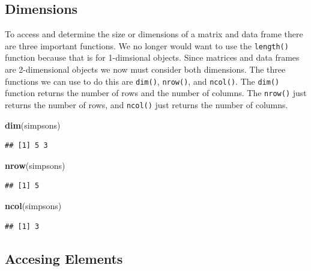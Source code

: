 \documentclass[
]{book}
\newenvironment{Shaded}{\begin{snugshade}}{\end{snugshade}}
\newcommand{\KeywordTok}[1]{\textcolor[rgb]{0.13,0.29,0.53}{\textbf{#1}}}
\newcommand{\NormalTok}[1]{#1}
\begin{document}
\hypertarget{dimensions}{%
\subsection{Dimensions}\label{dimensions}}

To access and determine the size or dimensions of a matrix and data frame there are three important functions. We no longer would want to use the \texttt{length()} function because that is for 1-dimsional objects. Since matrices and data frames are 2-dimensional objects we now must consider both dimensions. The three functions we can use to do this are \texttt{dim()}, \texttt{nrow()}, and \texttt{ncol()}. The \texttt{dim()} function returns the number of rows and the number of columns. The \texttt{nrow()} just returns the number of rows, and \texttt{ncol()} just returns the number of columns.

\begin{Shaded}
\begin{Highlighting}[]
\KeywordTok{dim}\NormalTok{(simpsons)}
\end{Highlighting}
\end{Shaded}

\begin{verbatim}
## [1] 5 3
\end{verbatim}

\begin{Shaded}
\begin{Highlighting}[]
\KeywordTok{nrow}\NormalTok{(simpsons)}
\end{Highlighting}
\end{Shaded}

\begin{verbatim}
## [1] 5
\end{verbatim}

\begin{Shaded}
\begin{Highlighting}[]
\KeywordTok{ncol}\NormalTok{(simpsons)}
\end{Highlighting}
\end{Shaded}

\begin{verbatim}
## [1] 3
\end{verbatim}

\hypertarget{accesing-elements}{%
\subsection{Accesing Elements}\label{accesing-elements}}
\end{document}
